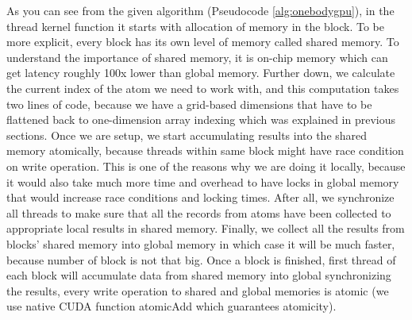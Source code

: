 \documentclass[12pt,letterpaper]{report}
\begin{document}
As you can see from the given algorithm (Pseudocode \ref{alg:onebodygpu}), in the thread kernel function it starts with allocation of memory in the block. To be more explicit, every block has its own level of memory called shared memory. To understand the importance of shared memory, it is on-chip memory which can get latency roughly 100x lower than global memory. Further down, we calculate the current index of the atom we need to work with, and this computation takes two lines of code, because we have a grid-based dimensions that have to be flattened back to one-dimension array indexing which was explained in previous sections. Once we are setup, we start accumulating results into the shared memory atomically, because threads within same block might have race condition on write operation. This is one of the reasons why we are doing it locally, because it would also take much more time and overhead to have locks in global memory that would increase race conditions and locking times. After all, we synchronize all threads to make sure that all the records from atoms have been collected to appropriate local results in shared memory. Finally, we collect all the results from blocks' shared memory into global memory in which case it will be much faster, because number of block is not that big. Once a block is finished, first thread of each block will accumulate data from shared memory into global synchronizing the results, every write operation to shared and global memories is atomic (we use native CUDA function atomicAdd which guarantees atomicity). 
\end{document}
